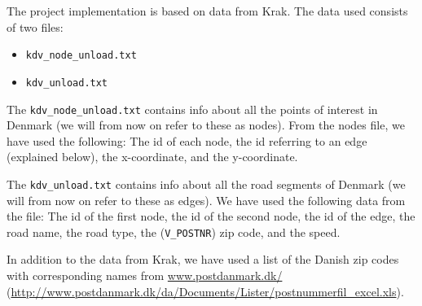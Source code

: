 The project implementation is based on data from Krak. The data used consists of two files:
\begin{itemize}
	\item \texttt{kdv\_node\_unload.txt}
	\item \texttt{kdv\_unload.txt}
\end{itemize}
The \texttt{kdv\_node\_unload.txt} contains info about all the points of interest in Denmark (we will from now on refer to these as nodes). From the nodes file, we have used the following: The id of each node, the id referring to an edge (explained below), the x-coordinate, and the y-coordinate.

The \texttt{kdv\_unload.txt} contains info about all the road segments of Denmark (we will from now on refer to these as edges). We have used the following data from the file: The id of the first node, the id of the second node, the id of the edge, the road name, the road type, the (\texttt{V\_POSTNR}) zip code, and the speed.

In addition to the data from Krak, we have used a list of the Danish zip codes with corresponding names from \href{http://www.postdanmark.dk/da/Documents/Lister/postnummerfil_excel.xls}{www.postdanmark.dk/} (\url{http://www.postdanmark.dk/da/Documents/Lister/postnummerfil_excel.xls}).